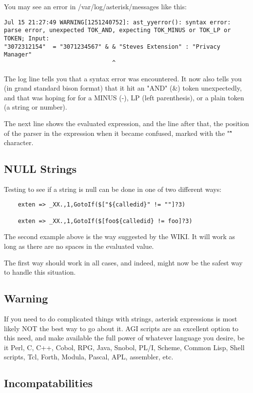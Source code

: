 You may see an error in /var/log/asterisk/messages like this:
\begin{verbatim}
Jul 15 21:27:49 WARNING[1251240752]: ast_yyerror(): syntax error: parse error, unexpected TOK_AND, expecting TOK_MINUS or TOK_LP or TOKEN; Input:
"3072312154"  = "3071234567" & & "Steves Extension" : "Privacy Manager" 
                               ^
\end{verbatim}

The log line tells you that a syntax error was encountered. It now
also tells you (in grand standard bison format) that it hit an "AND"
(\&) token unexpectedly, and that was hoping for for a MINUS (-), LP
(left parenthesis), or a plain token (a string or number).

The next line shows the evaluated expression, and the line after
that, the position of the parser in the expression when it became confused,
marked with the "\^" character.

\subsection{NULL Strings}
Testing to see if a string is null can be done in one of two different ways:
\begin{verbatim}
	exten => _XX.,1,GotoIf($["${calledid}" != ""]?3) 

	exten => _XX.,1,GotoIf($[foo${calledid} != foo]?3) 
\end{verbatim}

The second example above is the way suggested by the WIKI. It will 
work as long as there are no spaces in the evaluated value.

The first way should work in all cases, and indeed, might now
be the safest way to handle this situation.

\subsection{Warning}

If you need to do complicated things with strings, asterisk expressions
is most likely NOT the best way to go about it. AGI scripts are an
excellent option to this need, and make available the full power of
whatever language you desire, be it Perl, C, C++, Cobol, RPG, Java,
Snobol, PL/I, Scheme, Common Lisp, Shell scripts, Tcl, Forth, Modula,
Pascal, APL, assembler, etc.

\subsection{Incompatabilities}

